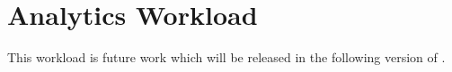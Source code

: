 \chapter{Analytics Workload}
\label{sec:analytics-workload}

This workload is future work which will be released in the following version of \ldbcfinbench.

